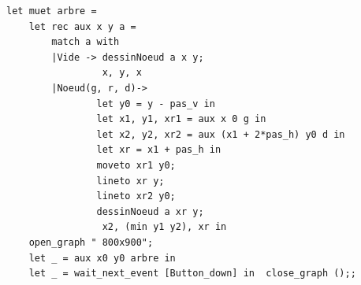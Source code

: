 \begin{Answer}
\begin{lstlisting}
let muet arbre =
    let rec aux x y a =
        match a with
        |Vide -> dessinNoeud a x y;
                 x, y, x
        |Noeud(g, r, d)-> 
                let y0 = y - pas_v in
                let x1, y1, xr1 = aux x 0 g in
                let x2, y2, xr2 = aux (x1 + 2*pas_h) y0 d in
                let xr = x1 + pas_h in
                moveto xr1 y0;
                lineto xr y;
                lineto xr2 y0;
                dessinNoeud a xr y;
                 x2, (min y1 y2), xr in
    open_graph " 800x900";
    let _ = aux x0 y0 arbre in
    let _ = wait_next_event [Button_down] in  close_graph ();;
\end{lstlisting}
\end{Answer}

